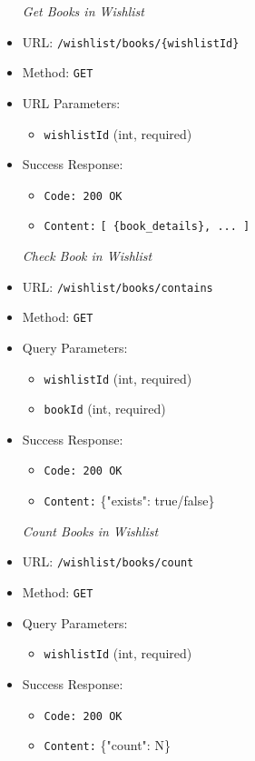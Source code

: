 \begin{itemize}
\item[\textit{Get Books in Wishlist}]
\item URL: \texttt{/wishlist/books/\{wishlistId\}}  
\item Method: \texttt{GET}  
\item URL Parameters:
\begin{itemize}
  \item \texttt{wishlistId} (int, required)
\end{itemize}
\item Success Response:
\begin{itemize}
  \item \texttt{Code: 200 OK}  
  \item \texttt{Content:} \texttt{[ \{book\_details\}, ... ]}
\end{itemize}

\item[\textit{Check Book in Wishlist}]
\item URL: \texttt{/wishlist/books/contains}  
\item Method: \texttt{GET}  
\item Query Parameters:
\begin{itemize}
  \item \texttt{wishlistId} (int, required)  
  \item \texttt{bookId} (int, required)
\end{itemize}
\item Success Response:
\begin{itemize}
  \item \texttt{Code: 200 OK}  
  \item \texttt{Content:} \{"exists": true/false\}
\end{itemize}

\item[\textit{Count Books in Wishlist}] 
\item URL: \texttt{/wishlist/books/count}  
\item Method: \texttt{GET}  
\item Query Parameters:
\begin{itemize}
  \item \texttt{wishlistId} (int, required)
\end{itemize}
\item Success Response:
\begin{itemize}
  \item \texttt{Code: 200 OK}  
  \item \texttt{Content:} \{"count": N\}
\end{itemize}



\end{itemize}
